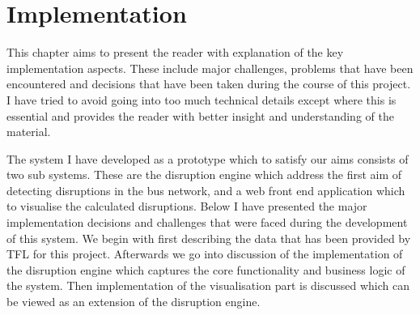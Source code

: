 \chapter{Implementation}
This chapter aims to present the reader with explanation of the key implementation aspects. These include major challenges, problems that have been encountered and decisions that have been taken during the course of this project. I have tried to avoid going into too much technical details except where this is essential and provides the reader with better insight and understanding of the material.

The system I have developed as a prototype which to satisfy our aims consists of two sub systems. These are the disruption engine which address the first aim of detecting disruptions in the bus network, and a web front end application which to visualise the calculated disruptions. Below I have presented the major implementation decisions and challenges that were faced during the development of this system. We begin with first describing the data that has been provided by TFL for this project. Afterwards we go into discussion of the implementation of the disruption engine which captures the core functionality and business logic of the system. Then implementation of the visualisation part is discussed which can be viewed as an extension of the disruption engine.

